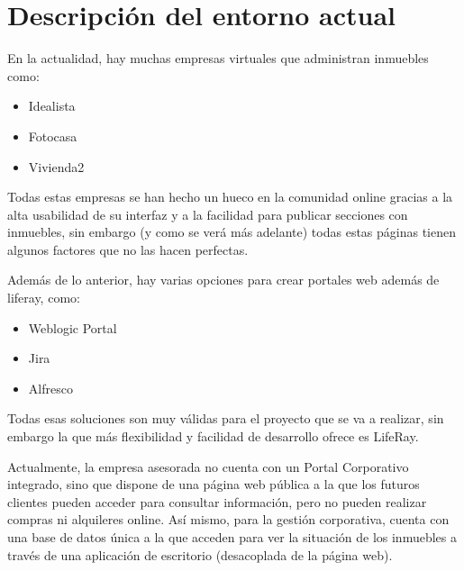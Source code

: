 \section{Descripción del entorno actual}
\par En la actualidad, hay muchas empresas virtuales que administran inmuebles como:
\begin{itemize}
	\item Idealista
	\item Fotocasa
	\item Vivienda2
\end{itemize}

\par Todas estas empresas se han hecho un hueco en la comunidad online gracias a la alta usabilidad de su interfaz y a la facilidad para publicar secciones con inmuebles, sin embargo (y como se verá más adelante) todas estas páginas tienen algunos factores que no las hacen perfectas.

\par Además de lo anterior, hay varias opciones para crear portales web además de liferay, como:
\begin{itemize}
	\item Weblogic Portal
	\item Jira
	\item Alfresco
\end{itemize}

\par Todas esas soluciones son muy válidas para el proyecto que se va a realizar, sin embargo la que más flexibilidad y facilidad de desarrollo ofrece es LifeRay.

\par Actualmente, la empresa asesorada no cuenta con un Portal Corporativo integrado, sino que dispone de una página web pública a la que los futuros clientes pueden acceder para consultar información, pero no pueden realizar compras ni alquileres online. Así mismo, para la gestión corporativa, cuenta con una base de datos única a la que acceden para ver la situación de los inmuebles a través de una aplicación de escritorio (desacoplada de la página web).

